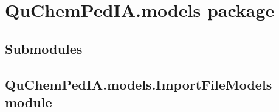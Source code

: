 \documentclass[letterpaper,10pt,english]{sphinxmanual}
\begin{document}
\section{QuChemPedIA.models package}
\label{\detokenize{QuChemPedIA.models:quchempedia-models-package}}\label{\detokenize{QuChemPedIA.models::doc}}

\subsection{Submodules}
\label{\detokenize{QuChemPedIA.models:submodules}}

\subsection{QuChemPedIA.models.ImportFileModels module}
\label{\detokenize{QuChemPedIA.models:module-QuChemPedIA.models.ImportFileModels}}\label{\detokenize{QuChemPedIA.models:quchempedia-models-importfilemodels-module}}
\end{document}
